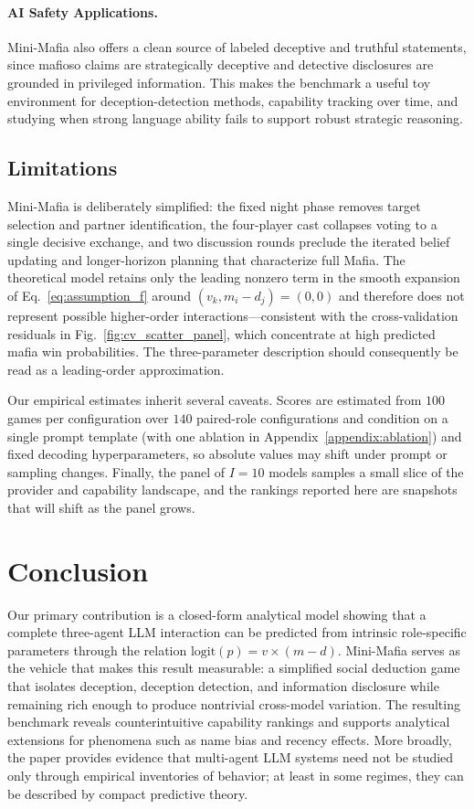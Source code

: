 \documentclass[sigconf,anonymous,balance=false]{aamas}
\begin{document}
\paragraph{AI Safety Applications.} Mini-Mafia also offers a clean source of labeled deceptive and truthful statements, since mafioso claims are strategically deceptive and detective disclosures are grounded in privileged information. This makes the benchmark a useful toy environment for deception-detection methods, capability tracking over time, and studying when strong language ability fails to support robust strategic reasoning.

\subsection{Limitations}
\label{sec:limitations}

Mini-Mafia is deliberately simplified: the fixed night phase removes target selection and partner identification, the four-player cast collapses voting to a single decisive exchange, and two discussion rounds preclude the iterated belief updating and longer-horizon planning that characterize full Mafia. The theoretical model retains only the leading nonzero term in the smooth expansion of Eq.~\eqref{eq:assumption_f} around $(v_k,m_i-d_j)=(0,0)$ and therefore does not represent possible higher-order interactions---consistent with the cross-validation residuals in Fig.~\ref{fig:cv_scatter_panel}, which concentrate at high predicted mafia win probabilities. The three-parameter description should consequently be read as a leading-order approximation.

Our empirical estimates inherit several caveats. Scores are estimated from $100$ games per configuration over $140$ paired-role configurations and condition on a single prompt template (with one ablation in Appendix~\ref{appendix:ablation}) and fixed decoding hyperparameters, so absolute values may shift under prompt or sampling changes. Finally, the panel of $I=10$ models samples a small slice of the provider and capability landscape, and the rankings reported here are snapshots that will shift as the panel grows.

\section{Conclusion}

Our primary contribution is a closed-form analytical model showing that a complete three-agent LLM interaction can be predicted from intrinsic role-specific parameters through the relation $\text{logit}(p) = v \times (m - d)$. Mini-Mafia serves as the vehicle that makes this result measurable: a simplified social deduction game that isolates deception, deception detection, and information disclosure while remaining rich enough to produce nontrivial cross-model variation. The resulting benchmark reveals counterintuitive capability rankings and supports analytical extensions for phenomena such as name bias and recency effects. More broadly, the paper provides evidence that multi-agent LLM systems need not be studied only through empirical inventories of behavior; at least in some regimes, they can be described by compact predictive theory.
\end{document}
